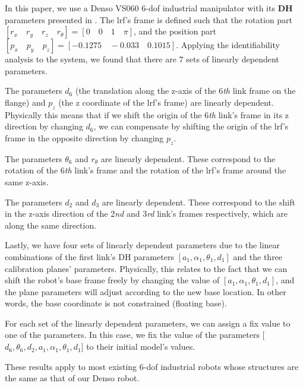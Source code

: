 In this paper, we use a Denso VS060 6-\ac{dof} industrial manipulator with its \textbf{DH} parameters presented in . The \ac{lrf}'s frame is defined such that the rotation part $[r_x \quad r_y \quad r_z \quad r_{\theta}] = [0 \quad 0 \quad 1 \quad \pi]$, and the position part $[p_x \quad p_y\quad p_z] = [-0.1275 \quad -0.033 \quad 0.1015]$. Applying the identifiability analysis to the system, we found that there are 7 sets of linearly dependent parameters. 
\begin{compactenum}
\item The parameters $d_6$ (the translation along the z-axis of the 6\textit{th} link frame on the flange) and $p_z$ (the z coordinate of the \ac{lrf}'s frame) are linearly dependent. Physically this means that if we shift the origin of the 6\textit{th} link's frame  in its z direction by changing $d_6$, we can compensate by shifting the origin of the \ac{lrf}'s frame in the opposite direction by changing $p_z$.
\item The parameters $\theta_6$ and $r_\theta$ are linearly dependent. These correspond to the rotation of the 6\textit{th} link's frame and the rotation of the \ac{lrf}'s frame around the same z-axis. 
\item The parameters $d_2$ and $d_3$ are linearly dependent. These correspond to the shift in the z-axis direction of the 2\textit{nd} and 3\textit{rd} link's frames respectively, which are along the same direction. 
\item Lastly, we have four sets of linearly dependent parameters due to the linear combinations of the first link's DH parameters $[a_1, \alpha_1, \theta_1, d_1 ]$ and the three calibration planes' parameters. Physically, this relates to the fact that we can shift the robot's base frame freely by changing the value of $[a_1, \alpha_1, \theta_1, d_1]$, and the plane parameters will adjust according to the new base location. In other words, the base coordinate is not constrained (floating base). 
\end{compactenum}

For each set of the linearly dependent parameters, we can assign a fix value to one of the parameters. In this case, we fix the value of the parameters [$d_6, \theta_6, d_2, a_1, \alpha_1, \theta_1, d_1$] to their initial model's values. 

These results apply to most existing 6-\ac{dof} industrial robots whose structures are the same as that of our Denso robot.


